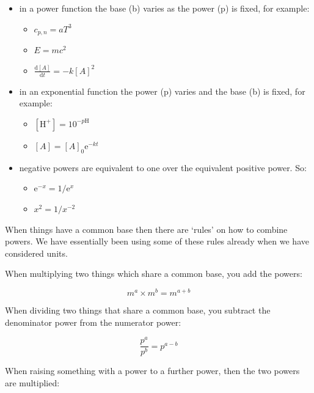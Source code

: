\documentclass[
]{book}
\providecommand{\tightlist}{%
  \setlength{\itemsep}{0pt}\setlength{\parskip}{0pt}}
\begin{document}
\begin{itemize}
\tightlist
\item
  in a power function the base (b) varies as the power (p) is fixed, for example:

  \begin{itemize}
  \tightlist
  \item
    \(c_{p,n} = aT^3\)
  \item
    \(E=mc^2\)
  \item
    \(\frac{\textrm{d}[A]}{\textrm{d}t}=-k[A]^2\)
  \end{itemize}
\item
  in an exponential function the power (p) varies and the base (b) is fixed, for example:

  \begin{itemize}
  \tightlist
  \item
    \([\textrm{H}^+]=10^{-p\textrm{H}}\)
  \item
    \([A]=[A]_0\textrm{e}^{-kt}\)
  \end{itemize}
\item
  negative powers are equivalent to one over the equivalent positive power. So:

  \begin{itemize}
  \tightlist
  \item
    \(\textrm{e}^{-x}= 1/\textrm{e}^{x}\)
  \item
    \(x^2 = 1 / x^{-2}\)
  \end{itemize}
\end{itemize}

When things have a common base then there are `rules' on how to combine powers. We have essentially been using some of these rules already when we have considered units.

When multiplying two things which share a common base, you add the powers:

\begin{equation}
m^a \times m^b = m^{a+b}
\label{eq:combpowermult}
\end{equation}

When dividing two things that share a common base, you subtract the denominator power from the numerator power:

\begin{equation}
\frac{p^a}{p^b} = p^{a - b}
\label{eq:combpowerdiv}
\end{equation}

When raising something with a power to a further power, then the two powers are multiplied:
\end{document}

